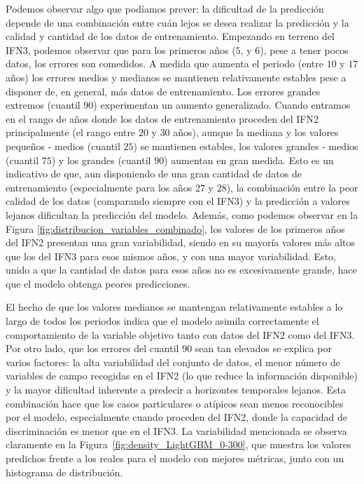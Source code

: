 Podemos observar algo que podíamos prever: la dificultad de la predicción depende de una combinación entre cuán lejos se desea realizar la predicción y la calidad y cantidad de los datos de entrenamiento. Empezando en terreno del IFN3, podemos observar que para los primeros años ($5$, y $6$), pese a tener pocos datos, los errores son comedidos. A medida que aumenta el periodo (entre $10$ y $17$ años) los errores medios y medianos se mantienen relativamente estables pese a disponer de, en general, más datos de entrenamiento. Los errores grandes extremos (cuantil $90$) experimentan un aumento generalizado. Cuando entramos en el rango de años donde los datos de entrenamiento proceden del IFN2 principalmente (el rango entre $20$ y $30$ años), aunque la mediana y los valores pequeños - medios (cuantil $25$) se mantienen estables, los valores grandes - medios (cuantil $75$) y los grandes (cuantil $90$) aumentan en gran medida. Esto es un indicativo de que, aun disponiendo de una gran cantidad de datos de entrenamiento (especialmente para los años $27$ y $28$), la combinación entre la peor calidad de los datos (comparando siempre con el IFN3) y la predicción a valores lejanos dificultan la predicción del modelo. Además, como podemos observar en la Figura \ref{fig:distribucion_variables_combinado}, los valores de los primeros años del IFN2 presentan una gran variabilidad, siendo en su mayoría valores más altos que los del IFN3 para esos mismos años, y con una mayor variabilidad. Esto, unido a que la cantidad de datos para esos años no es excesivamente grande, hace que el modelo obtenga peores predicciones.

El hecho de que los valores medianos se mantengan relativamente estables a lo largo de todos los periodos indica que el modelo asimila correctamente el comportamiento de la variable objetivo tanto con datos del IFN2 como del IFN3. Por otro lado, que los errores del cuantil $90$ sean tan elevados se explica por varios factores: la alta variabilidad del conjunto de datos, el menor número de variables de campo recogidas en el IFN2 (lo que reduce la información disponible) y la mayor dificultad inherente a predecir a horizontes temporales lejanos. Esta combinación hace que los casos particulares o atípicos sean menos reconocibles por el modelo, especialmente cuando proceden del IFN2, donde la capacidad de discriminación es menor que en el IFN3. La variabilidad mencionada se observa claramente en la Figura~\ref{fig:density_LightGBM_0-300}, que muestra los valores predichos frente a los reales para el modelo con mejores métricas, junto con un histograma de distribución.

